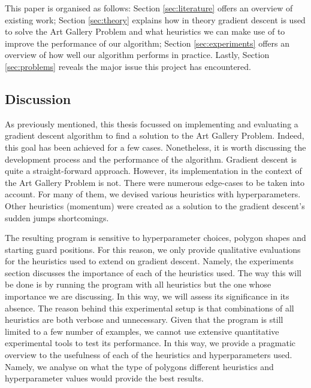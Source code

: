 This paper is organised as follows: Section \ref{sec:literature} offers an overview of existing work; Section \ref{sec:theory} explains how in theory gradient descent is used to solve the Art Gallery Problem and what heuristics we can make use of to improve the performance of our algorithm; Section \ref{sec:experiments} offers an overview of how well our algorithm performs in practice. Lastly, Section \ref{sec:problems} reveals the major issue this project has encountered.

\subsection{Discussion}
As previously mentioned, this thesis focussed on implementing and evaluating a gradient descent algorithm to find a solution to the Art Gallery Problem. Indeed, this goal has been achieved for a few cases. 
Nonetheless, it is worth discussing the development process and the performance of the algorithm. Gradient descent is quite a straight-forward approach. However, its implementation in the context of the Art Gallery Problem is not. There were numerous edge-cases to be taken into account. For many of them, we devised various heuristics with hyperparameters. Other heuristics (momentum) were created as a solution to the gradient descent's sudden jumps shortcomings.

The resulting program is sensitive to hyperparameter choices, polygon shapes and starting guard positions. For this reason, we only provide qualitative evaluations for the heuristics used to extend on gradient descent. Namely, the experiments section discusses the importance of each of the heuristics used. The way this will be done is by running the program with all heuristics but the one whose importance we are discussing. In this way, we will assess its significance in its absence. The reason behind this experimental setup is that combinations of all heuristics are both verbose and unnecessary. Given that the program is still limited to a few number of examples, we cannot use extensive quantitative experimental tools to test its performance.
In this way, we provide a pragmatic overview to the usefulness of each of the heuristics and hyperparameters used. Namely, we analyse on what the type of polygons different heuristics and hyperparameter values would provide the best results.



